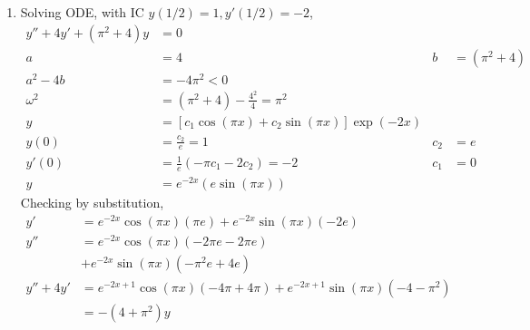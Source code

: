 \begin{enumerate}
    \item Solving ODE, with IC $ y(1/2) = 1, y'(1/2) = -2 $,
          \begin{align}
              y'' + 4y' + (\pi^{2} + 4)y & = 0                                         \\
              a                          & = 4                                       &
              b                          & = (\pi^{2} + 4)                             \\
              a^{2} - 4b                 & = -4\pi ^{2} < 0                            \\
              \omega^{2}                 & = (\pi ^{2} + 4) - \frac{4^{2}}{4}
              = \pi ^{2}                                                               \\
              y                          & = [c_{1}\cos(\pi x) + c_{2}\sin(\pi x)]
              \exp(-2x)                                                                \\
              y(0)                       & = \frac{c_{2}}{e} = 1                     &
              c_{2}                      & = e                                         \\
              y'(0)                      & = \frac{1}{e} (-\pi c_{1} - 2 c_{2}) = -2 &
              c_{1}                      & = 0                                         \\
              y                          & = e^{-2x}\left( e\sin(\pi x) \right)
          \end{align}
          Checking by substitution,
          \begin{align}
              y'        & = e^{-2x}\cos(\pi x) (\pi e) + e^{-2x}\sin(\pi x)(-2e) \\
              y''       & = e^{-2x}\cos(\pi x)(-2\pi e -2\pi e)                  \\
                        & + e^{-2x}\sin(\pi x)(-\pi ^{2}e + 4e)                  \\
              y'' + 4y' & = e^{-2x+1}\cos(\pi x)(-4\pi + 4\pi)
              + e^{-2x+1}\sin(\pi x)(-4-\pi ^{2})                                \\
                        & = -(4 + \pi ^{2})y
          \end{align}


\end{enumerate}
